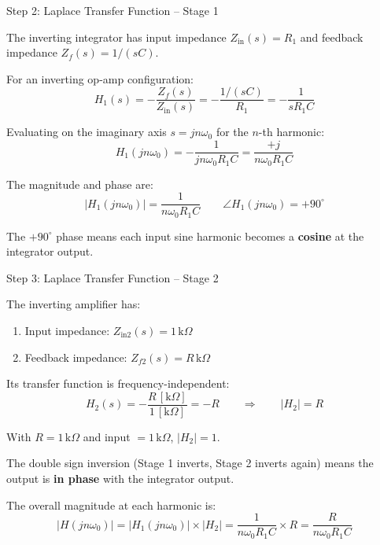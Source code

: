 \documentclass{beamer}
\numberwithin{equation}{section}
\theoremstyle{remark}
\begin{document}
\begin{frame}{Step 2: Laplace Transfer Function -- Stage 1}
 
The inverting integrator has input impedance $Z_{\mathrm{in}}(s) = R_1$
and feedback impedance $Z_f(s) = 1/(sC)$.
 
For an inverting op-amp configuration:
\[
  H_1(s) = -\frac{Z_f(s)}{Z_{\mathrm{in}}(s)}
          = -\frac{1/(sC)}{R_1}
          = -\frac{1}{sR_1C}
\]
 
Evaluating on the imaginary axis $s = jn\omega_0$ for the $n$-th harmonic:
\[
  H_1(jn\omega_0)
  = -\frac{1}{jn\omega_0 R_1 C}
  = \frac{+j}{n\omega_0 R_1 C}
\]
 
The magnitude and phase are:
\[
  \left|H_1(jn\omega_0)\right| = \frac{1}{n\omega_0 R_1 C}
  \qquad
  \angle H_1(jn\omega_0) = +90^\circ
\]
 
The $+90^\circ$ phase means each input sine harmonic
becomes a \textbf{cosine} at the integrator output.
 
\end{frame}
 
\begin{frame}{Step 3: Laplace Transfer Function -- Stage 2}
 
The inverting amplifier has:
 
\begin{enumerate}
  \item Input impedance: $Z_{\mathrm{in2}}(s) = 1\,\mathrm{k}\Omega$
  \item Feedback impedance: $Z_{f2}(s) = R\,\mathrm{k}\Omega$
\end{enumerate}
 
Its transfer function is frequency-independent:
\[
  H_2(s) = -\frac{R\,[\mathrm{k}\Omega]}{1\,[\mathrm{k}\Omega]} = -R
  \qquad\Longrightarrow\qquad
  \left|H_2\right| = R
\]
 
With $R = 1\,\mathrm{k}\Omega$ and input $= 1\,\mathrm{k}\Omega$, $|H_2| = 1$.
 
The double sign inversion (Stage 1 inverts, Stage 2 inverts again)
means the output is \textbf{in phase} with the integrator output.
 
The overall magnitude at each harmonic is:
\[
  \left|H(jn\omega_0)\right|
  = \left|H_1(jn\omega_0)\right| \times \left|H_2\right|
  = \frac{1}{n\omega_0 R_1 C} \times R
  = \frac{R}{n\omega_0 R_1 C}
\]
 
\end{frame}
 
\end{document}
